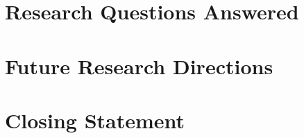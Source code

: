 \section{Research Questions Answered}
\label{sec:conc_rqs}


\section{Future Research Directions}
\label{sec:conc_future}

%
%
%
%
%
%

\section{Closing Statement}
\label{sec:conc_closing}

